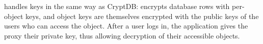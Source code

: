 %

%
%
%
%
%

\syscrypt handles keys in the same way as CryptDB: \syscrypt encrypts database rows
with per-object keys, and object keys are themselves encrypted with the public keys
of the users who can access the object.
%
After a user logs in, the application gives the proxy their private key, thus
allowing decryption of their accessible objects.
%
%


